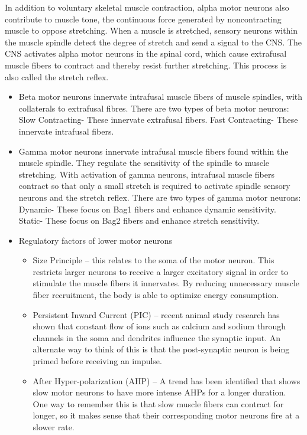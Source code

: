 In addition to voluntary skeletal muscle contraction, alpha motor neurons also contribute to muscle tone, the continuous force generated by noncontracting muscle to oppose stretching. When a muscle is stretched, sensory neurons within the muscle spindle detect the degree of stretch and send a signal to the CNS. The CNS activates alpha motor neurons in the spinal cord, which cause extrafusal muscle fibers to contract and thereby resist further stretching. This process is also called the stretch reflex.

\begin{itemize}
\tightlist
\item
  Beta motor neurons innervate intrafusal muscle fibers of muscle spindles, with collaterals to extrafusal fibres. There are two types of beta motor neurons: Slow Contracting- These innervate extrafusal fibers. Fast Contracting- These innervate intrafusal fibers.
\item
  Gamma motor neurons innervate intrafusal muscle fibers found within the muscle spindle. They regulate the sensitivity of the spindle to muscle stretching. With activation of gamma neurons, intrafusal muscle fibers contract so that only a small stretch is required to activate spindle sensory neurons and the stretch reflex. There are two types of gamma motor neurons: Dynamic- These focus on Bag1 fibers and enhance dynamic sensitivity. Static- These focus on Bag2 fibers and enhance stretch sensitivity.
\item
  Regulatory factors of lower motor neurons

  \begin{itemize}
  \tightlist
  \item
    Size Principle -- this relates to the soma of the motor neuron. This restricts larger neurons to receive a larger excitatory signal in order to stimulate the muscle fibers it innervates. By reducing unnecessary muscle fiber recruitment, the body is able to optimize energy consumption.
  \item
    Persistent Inward Current (PIC) -- recent animal study research has shown that constant flow of ions such as calcium and sodium through channels in the soma and dendrites influence the synaptic input. An alternate way to think of this is that the post-synaptic neuron is being primed before receiving an impulse.
  \item
    After Hyper-polarization (AHP) -- A trend has been identified that shows slow motor neurons to have more intense AHPs for a longer duration. One way to remember this is that slow muscle fibers can contract for longer, so it makes sense that their corresponding motor neurons fire at a slower rate.
  \end{itemize}
\end{itemize}

